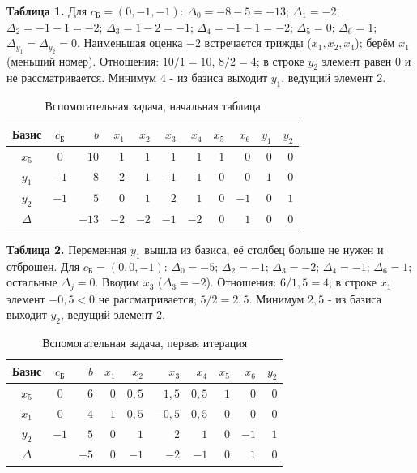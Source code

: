 \documentclass[a4paper,12pt]{article}
\begin{document}
\textbf{Таблица 1.} Для $c_{\text{Б}} = (0,-1,-1)$:
$\Delta_0 = -8-5 = -13$; $\Delta_1 = -2$; $\Delta_2 = -1-1 = -2$; $\Delta_3 = 1-2 = -1$; $\Delta_4 = -1-1 = -2$; $\Delta_5 = 0$; $\Delta_6 = 1$; $\Delta_{y_1} = \Delta_{y_2} = 0$.
Наименьшая оценка $-2$ встречается трижды ($x_1, x_2, x_4$); берём $x_1$ (меньший номер). Отношения: $10/1 = 10$, $8/2 = 4$; в строке $y_2$ элемент равен $0$ и не рассматривается. Минимум $4$ - из базиса выходит $y_1$, ведущий элемент $2$.

\begin{table}[H]
\centering\small
\caption{Вспомогательная задача, начальная таблица}
\begin{tabular}{|c|c|r|r|r|r|r|r|r|r|r|}
\hline
Базис & $c_{\text{Б}}$ & $b$ & $x_{1}$ & $x_{2}$ & $x_{3}$ & $x_{4}$ & $x_{5}$ & $x_{6}$ & $y_{1}$ & $y_{2}$ \\ \hline
$x_{5}$ & $0$ & $10$ & $1$ & $1$ & $1$ & $1$ & $1$ & $0$ & $0$ & $0$ \\
$y_{1}$ & $-1$ & $8$ & $\boxed{2}$ & $1$ & $-1$ & $1$ & $0$ & $0$ & $1$ & $0$ \\
$y_{2}$ & $-1$ & $5$ & $0$ & $1$ & $2$ & $1$ & $0$ & $-1$ & $0$ & $1$ \\
\hline
$\Delta$ & & $-13$ & $-2$ & $-2$ & $-1$ & $-2$ & $0$ & $1$ & $0$ & $0$ \\ \hline
\end{tabular}
\end{table}

\textbf{Таблица 2.} Переменная $y_1$ вышла из базиса, её столбец больше не нужен и отброшен. Для $c_{\text{Б}} = (0,0,-1)$: $\Delta_0 = -5$; $\Delta_2 = -1$; $\Delta_3 = -2$; $\Delta_4 = -1$; $\Delta_6 = 1$; остальные $\Delta_j = 0$. Вводим $x_3$ ($\Delta_3 = -2$). Отношения: $6/1{,}5 = 4$; в строке $x_1$ элемент $-0{,}5 < 0$ не рассматривается; $5/2 = 2{,}5$. Минимум $2{,}5$ - из базиса выходит $y_2$, ведущий элемент $2$.

\begin{table}[H]
\centering\small
\caption{Вспомогательная задача, первая итерация}
\begin{tabular}{|c|c|r|r|r|r|r|r|r|r|}
\hline
Базис & $c_{\text{Б}}$ & $b$ & $x_{1}$ & $x_{2}$ & $x_{3}$ & $x_{4}$ & $x_{5}$ & $x_{6}$ & $y_{2}$ \\ \hline
$x_{5}$ & $0$ & $6$ & $0$ & $0{,}5$ & $1{,}5$ & $0{,}5$ & $1$ & $0$ & $0$ \\
$x_{1}$ & $0$ & $4$ & $1$ & $0{,}5$ & $-0{,}5$ & $0{,}5$ & $0$ & $0$ & $0$ \\
$y_{2}$ & $-1$ & $5$ & $0$ & $1$ & $\boxed{2}$ & $1$ & $0$ & $-1$ & $1$ \\
\hline
$\Delta$ & & $-5$ & $0$ & $-1$ & $-2$ & $-1$ & $0$ & $1$ & $0$ \\ \hline
\end{tabular}
\end{table}
\end{document}
